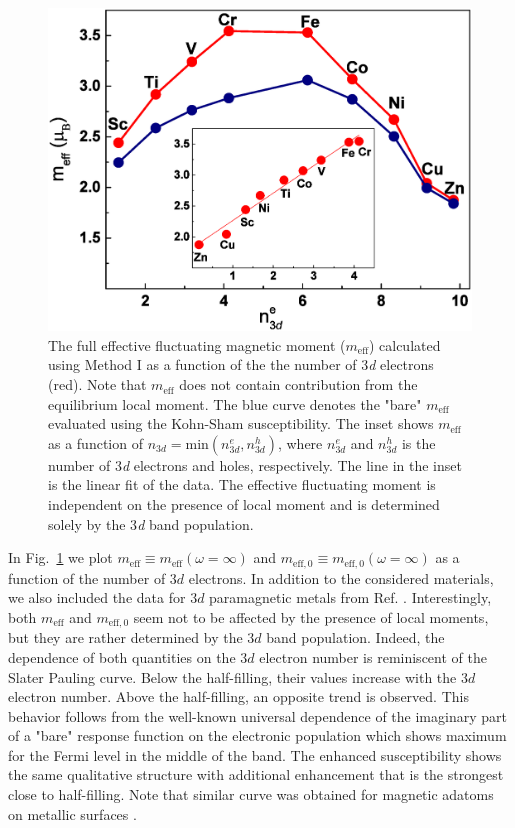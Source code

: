 \begin{figure}[h!]
\centering
\includegraphics[width=0.55\hsize]{Chapters/TDDFT/figures/Article/Meff.eps}
\caption{The full effective fluctuating magnetic moment ($m_{\text{eff}}$) calculated using Method I as a function of the the number of 3\emph{d} electrons (red). Note that $m_{\text{eff}}$ does not contain contribution from the equilibrium local moment. The blue curve denotes the "bare" $m_{\text{eff}}$ evaluated using the Kohn-Sham susceptibility. The inset shows $m_{\text{eff}}$ as a function of $n_{3d}=\text{min}\left(n^{e}_{3d},n^{h}_{3d}\right)$, where $n^{e}_{3d}$ and $n^{h}_{3d}$ is the number of 3\emph{d} electrons and holes, respectively. The line in the inset is the linear fit of the data. The effective fluctuating moment is independent on the presence of local moment and is determined solely by the 3\emph{d} band population.}
\label{Meff}
\end{figure}  


In Fig.~\ref{Meff} we plot $m_{\text{eff}}\equiv m_{\text{eff}}(\omega=\infty)$ and $m_{\text{eff},0}\equiv m_{\text{eff},0}(\omega=\infty)$ as a function of the number of $3d$ electrons. In addition to the considered materials, we also included the data for $3d$ paramagnetic metals from Ref. \citep{Wysocki}. Interestingly, both $m_{\text{eff}}$ and $m_{\text{eff},0}$ seem not to be affected by the presence of local moments, but they are rather determined by the $3d$ band population. Indeed, the dependence of both quantities on the $3d$ electron number is reminiscent of the Slater Pauling curve. Below the half-filling, their values increase with the $3d$ electron number. Above the half-filling, an opposite trend is observed. This behavior follows from the well-known universal dependence of the imaginary part of a "bare" response function on the electronic population which shows maximum for the Fermi level in the middle of the band. The enhanced susceptibility shows the same qualitative structure with additional enhancement that is the strongest close to half-filling. Note that similar curve was obtained for magnetic adatoms on metallic surfaces \citep{Lounis2}.

